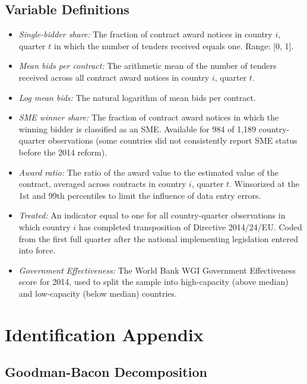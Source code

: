 \documentclass[12pt]{article}
\begin{document}
\subsection{Variable Definitions}

\begin{itemize}
\item \textit{Single-bidder share:} The fraction of contract award notices in country $i$, quarter $t$ in which the number of tenders received equals one. Range: [0, 1].
\item \textit{Mean bids per contract:} The arithmetic mean of the number of tenders received across all contract award notices in country $i$, quarter $t$.
\item \textit{Log mean bids:} The natural logarithm of mean bids per contract.
\item \textit{SME winner share:} The fraction of contract award notices in which the winning bidder is classified as an SME. Available for 984 of 1,189 country-quarter observations (some countries did not consistently report SME status before the 2014 reform).
\item \textit{Award ratio:} The ratio of the award value to the estimated value of the contract, averaged across contracts in country $i$, quarter $t$. Winsorized at the 1st and 99th percentiles to limit the influence of data entry errors.
\item \textit{Treated:} An indicator equal to one for all country-quarter observations in which country $i$ has completed transposition of Directive 2014/24/EU. Coded from the first full quarter after the national implementing legislation entered into force.
\item \textit{Government Effectiveness:} The World Bank WGI Government Effectiveness score for 2014, used to split the sample into high-capacity (above median) and low-capacity (below median) countries.
\end{itemize}


\section{Identification Appendix}
\label{app:identification}

\subsection{Goodman-Bacon Decomposition}
\end{document}
